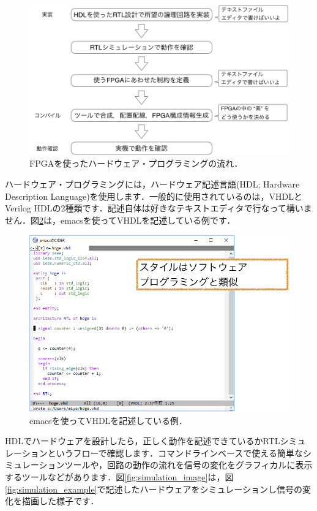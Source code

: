 \documentclass[a4paper,dvipdfmx]{jsarticle}
\begin{document}
 \begin{figure}[H]
  \begin{center}
   \includegraphics[width=.8\textwidth]{chapter01_figures/fpga_development_flow.png}
  \end{center}
  \caption{FPGAを使ったハードウェア・プログラミングの流れ．\label{fig:fpga_development_flow}}
 \end{figure}

ハードウェア・プログラミングには，ハードウェア記述言語(HDL; Hardware Description Language)を使用します．一般的に使用されているのは，VHDLとVerilog HDLの2種類です．記述自体は好きなテキストエディタで行なって構いません．図\ref{fig:writing_vhdl_example}は，emacsを使ってVHDLを記述している例です．

 \begin{figure}[H]
  \begin{center}
   \includegraphics[width=.8\textwidth]{chapter01_figures/writing_vhdl_example.png}
  \end{center}
  \caption{emacsを使ってVHDLを記述している例．\label{fig:writing_vhdl_example}}
 \end{figure}

HDLでハードウェアを設計したら，正しく動作を記述できているかRTLシミュレーションというフローで確認します．コマンドラインベースで使える簡単なシミュレーションツールや，回路の動作の流れを信号の変化をグラフィカルに表示するツールなどがあります．図\ref{fig:simulation_image}は，図\ref{fig:simulation_example}で記述したハードウェアをシミュレーションし信号の変化を描画した様子です．
\end{document}

